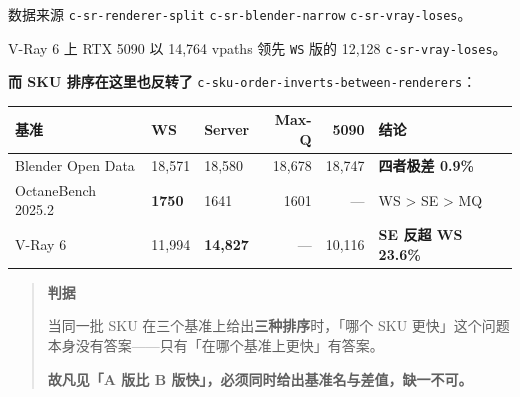 数据来源 {\scriptsize\texttt{c-\hspace{0pt}sr-\hspace{0pt}renderer-\hspace{0pt}split}} {\scriptsize\texttt{c-\hspace{0pt}sr-\hspace{0pt}blender-\hspace{0pt}narrow}} {\scriptsize\texttt{c-\hspace{0pt}sr-\hspace{0pt}vray-\hspace{0pt}loses}}。


V-Ray 6 上 RTX 5090 以 14,764 vpaths 领先 \texttt{WS} 版的 12,128 {\scriptsize\texttt{c-\hspace{0pt}sr-\hspace{0pt}vray-\hspace{0pt}loses}}。


\textbf{而 SKU 排序在这里也反转了} {\scriptsize\texttt{c-\hspace{0pt}sku-\hspace{0pt}order-\hspace{0pt}inverts-\hspace{0pt}between-\hspace{0pt}renderers}}：


\begin{table}[t]
\centering
\footnotesize
\setlength{\tabcolsep}{4pt}
\label{tab:20}
\begin{tabular}{lllrrl}
\toprule
基准 & WS & Server & Max-Q & 5090 & 结论 \\
\midrule
Blender Open Data & 18,571 & 18,580 & 18,678 & 18,747 & \textbf{四者极差 0.9\%} \\
OctaneBench 2025.2 & \textbf{1750} & 1641 & 1601 & — & WS > SE > MQ \\
V-Ray 6 & 11,994 & \textbf{14,827} & — & 10,116 & \textbf{SE 反超 WS 23.6\%} \\
\bottomrule
\end{tabular}
\end{table}

\begin{quote}\small
\textbf{ 判据}

当同一批 SKU 在三个基准上给出\textbf{三种排序}时，「哪个 SKU 更快」这个问题本身没有答案——只有「在哪个基准上更快」有答案。

\textbf{故凡见「A 版比 B 版快」，必须同时给出基准名与差值，缺一不可。}

\end{quote}

